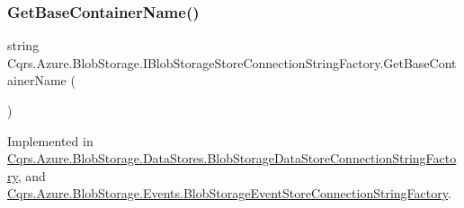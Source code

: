 \subsubsection{\texorpdfstring{Get\+Base\+Container\+Name()}{GetBaseContainerName()}}
{\footnotesize\ttfamily string Cqrs.\+Azure.\+Blob\+Storage.\+I\+Blob\+Storage\+Store\+Connection\+String\+Factory.\+Get\+Base\+Container\+Name (\begin{DoxyParamCaption}{ }\end{DoxyParamCaption})}



Implemented in \hyperlink{classCqrs_1_1Azure_1_1BlobStorage_1_1DataStores_1_1BlobStorageDataStoreConnectionStringFactory_af9d95c58f5f275d9c9c1575b3d147bdb}{Cqrs.\+Azure.\+Blob\+Storage.\+Data\+Stores.\+Blob\+Storage\+Data\+Store\+Connection\+String\+Factory}, and \hyperlink{classCqrs_1_1Azure_1_1BlobStorage_1_1Events_1_1BlobStorageEventStoreConnectionStringFactory_a0e6aadced9c9a583884899a4c9de2f1a}{Cqrs.\+Azure.\+Blob\+Storage.\+Events.\+Blob\+Storage\+Event\+Store\+Connection\+String\+Factory}.

